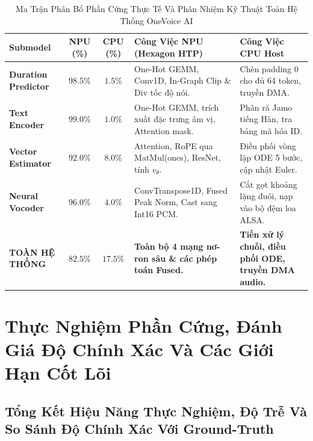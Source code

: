 \documentclass[11pt,a4paper,oneside,table]{report}
\begin{document}
\begin{table}[H]
\centering
\small
\sffamily
\caption{Ma Trận Phân Bổ Phần Cứng Thực Tế Và Phân Nhiệm Kỹ Thuật Toàn Hệ Thống OneVoice AI}
\label{tab:hardware_master_matrix}
\vspace{2mm}
\begin{tabularx}{\textwidth}{l c c p{4.2cm} p{4.5cm}}
\toprule
\textbf{Submodel} & \textbf{NPU (\%)} & \textbf{CPU (\%)} & \textbf{Công Việc NPU (Hexagon HTP)} & \textbf{Công Việc CPU Host} \\
\midrule
\textbf{Duration Predictor} & $\mathbf{98.5\%}$ & $1.5\%$ & One-Hot GEMM, Conv1D, In-Graph Clip \& Div tốc độ nói. & Chèn padding 0 cho đủ 64 token, truyền DMA. \\
\addlinespace
\textbf{Text Encoder} & $\mathbf{99.0\%}$ & $1.0\%$ & One-Hot GEMM, trích xuất đặc trưng âm vị, Attention mask. & Phân rã Jamo tiếng Hàn, tra bảng mã hóa ID. \\
\addlinespace
\textbf{Vector Estimator} & $\mathbf{92.0\%}$ & $8.0\%$ & Attention, RoPE qua MatMul(ones), ResNet, tính $v_\theta$. & Điều phối vòng lặp ODE 5 bước, cập nhật Euler. \\
\addlinespace
\textbf{Neural Vocoder} & $\mathbf{96.0\%}$ & $4.0\%$ & ConvTranspose1D, Fused Peak Norm, Cast sang Int16 PCM. & Cắt gọt khoảng lặng đuôi, nạp vào bộ đệm loa ALSA. \\
\midrule
\textbf{TOÀN HỆ THỐNG} & $\mathbf{82.5\%}$ & $\mathbf{17.5\%}$ & \textbf{Toàn bộ 4 mạng nơ-ron sâu \& các phép toán Fused.} & \textbf{Tiền xử lý chuỗi, điều phối ODE, truyền DMA audio.} \\
\bottomrule
\end{tabularx}
\end{table}

\part{Thực Nghiệm Phần Cứng, Đánh Giá Độ Chính Xác Và Các Giới Hạn Cốt Lõi}

\chapter{Tổng Kết Hiệu Năng Thực Nghiệm, Độ Trễ Và So Sánh Độ Chính Xác Với Ground-Truth}
\label{chap:benchmarks_and_accuracy}
\end{document}
